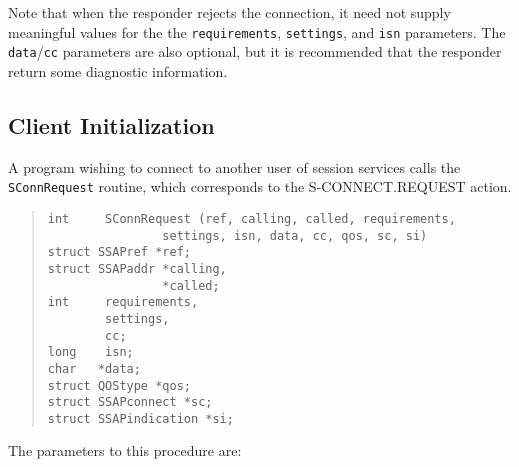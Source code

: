 Note that when the responder rejects the connection,
it need not supply meaningful values for the the \verb"requirements",
\verb"settings", and \verb"isn" parameters.
The \verb"data"/\verb"cc" parameters are also optional,
but it is recommended that the responder return some diagnostic information.

\subsection	{Client Initialization}
A program wishing to connect to another user of session services calls the
\verb"SConnRequest" routine,
which corresponds to the {\sf S-CONNECT.REQUEST\/} action.
\begin{quote}\small\begin{verbatim}
int     SConnRequest (ref, calling, called, requirements,
                settings, isn, data, cc, qos, sc, si)
struct SSAPref *ref;
struct SSAPaddr *calling,
                *called;
int     requirements,
        settings,
        cc;
long	isn;
char   *data;
struct QOStype *qos;
struct SSAPconnect *sc;
struct SSAPindication *si;
\end{verbatim}\end{quote}
The parameters to this procedure are:
